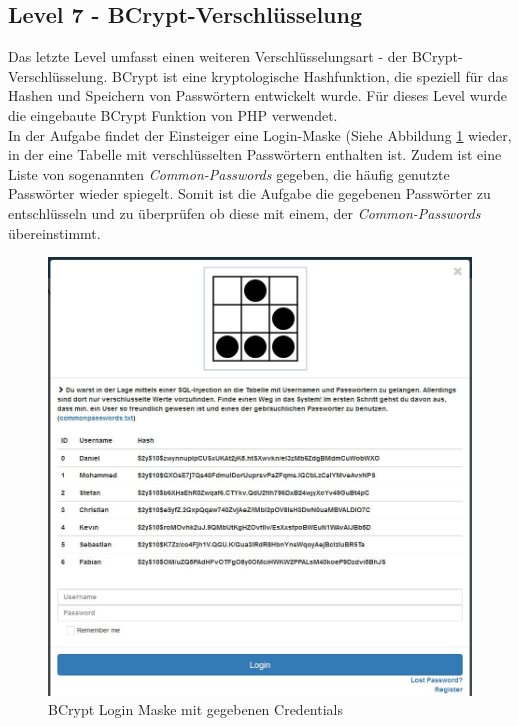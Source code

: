 \subsection{Level 7 - BCrypt-Verschlüsselung}
Das letzte Level umfasst einen weiteren Verschlüsselungsart - der BCrypt-Verschlüsselung. BCrypt ist eine kryptologische Hashfunktion, die speziell für das Hashen und Speichern von Passwörtern entwickelt wurde. Für dieses Level wurde die eingebaute BCrypt Funktion von PHP verwendet. \\
In der Aufgabe findet der Einsteiger eine Login-Maske (Siehe Abbildung \ref{fig:login_parcrous_level7_bcrypt_maske} wieder, in der eine Tabelle mit verschlüsselten Passwörtern enthalten ist. Zudem ist eine Liste von sogenannten \textit{Common-Passwords} gegeben, die häufig genutzte Passwörter wieder spiegelt. Somit ist die Aufgabe die gegebenen Passwörter zu entschlüsseln und zu überprüfen ob diese mit einem, der \textit{Common-Passwords} übereinstimmt. 

\begin{figure}[H]
	\centering
	\includegraphics[width=\textwidth]{images/LoginParcours/login_parcrous_level7_bcrypt_maske.jpg}
	\caption{BCrypt Login Maske mit gegebenen Credentials}
	\label{fig:login_parcrous_level7_bcrypt_maske}
\end{figure}


